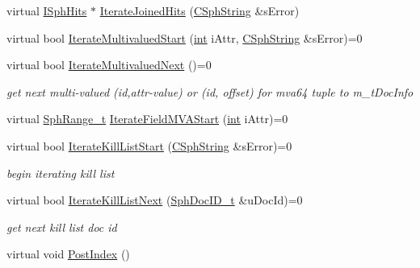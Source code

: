 \begin{DoxyCompactItemize}
\item 
virtual \hyperlink{classISphHits}{I\-Sph\-Hits} $\ast$ \hyperlink{classCSphSource_a59e3058af78b877c3fd864e99b9a23e0}{Iterate\-Joined\-Hits} (\hyperlink{structCSphString}{C\-Sph\-String} \&s\-Error)
\item 
virtual bool \hyperlink{classCSphSource_a9c153cf946c203bf8a8b29d1c10787bf}{Iterate\-Multivalued\-Start} (\hyperlink{sphinxexpr_8cpp_a4a26e8f9cb8b736e0c4cbf4d16de985e}{int} i\-Attr, \hyperlink{structCSphString}{C\-Sph\-String} \&s\-Error)=0
\item 
virtual bool \hyperlink{classCSphSource_a96b70f84184221299e21078ba7c45405}{Iterate\-Multivalued\-Next} ()=0
\begin{DoxyCompactList}\small\item\em get next multi-\/valued (id,attr-\/value) or (id, offset) for mva64 tuple to m\-\_\-t\-Doc\-Info \end{DoxyCompactList}\item 
virtual \hyperlink{structSphRange__t}{Sph\-Range\-\_\-t} \hyperlink{classCSphSource_a246c838907aa826773dd777d7177603f}{Iterate\-Field\-M\-V\-A\-Start} (\hyperlink{sphinxexpr_8cpp_a4a26e8f9cb8b736e0c4cbf4d16de985e}{int} i\-Attr)=0
\item 
virtual bool \hyperlink{classCSphSource_a03c3bdd36535b2ef9e3dca04efbfdee2}{Iterate\-Kill\-List\-Start} (\hyperlink{structCSphString}{C\-Sph\-String} \&s\-Error)=0
\begin{DoxyCompactList}\small\item\em begin iterating kill list \end{DoxyCompactList}\item 
virtual bool \hyperlink{classCSphSource_a612f192dcf6b2705895fe1ca478cf224}{Iterate\-Kill\-List\-Next} (\hyperlink{sphinx_8h_a3176771631c12a9e4897272003e6b447}{Sph\-Doc\-I\-D\-\_\-t} \&u\-Doc\-Id)=0
\begin{DoxyCompactList}\small\item\em get next kill list doc id \end{DoxyCompactList}\item 
virtual void \hyperlink{classCSphSource_ab769d6c93df8cd8097f9836df6e5843a}{Post\-Index} ()
\end{DoxyCompactItemize}
